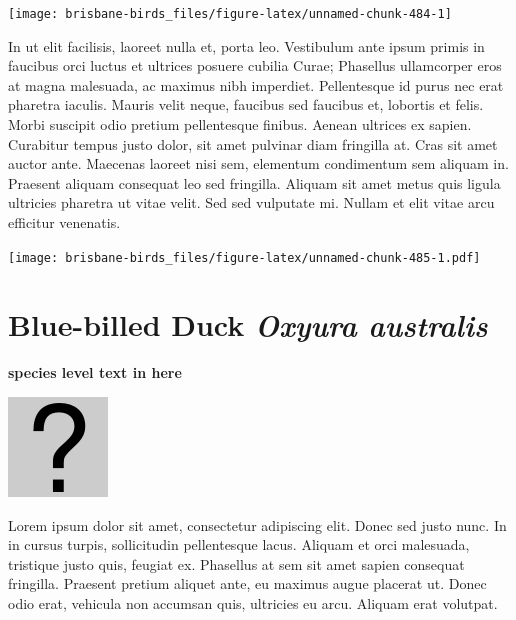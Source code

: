 \documentclass[]{book}
\let\origfigure\figure
\let\endorigfigure\endfigure
\renewenvironment{figure}[1][2] {
  \expandafter\origfigure\expandafter[H]
} {
  \endorigfigure
}
\begin{document}
\begin{figure}
\texttt{[image: brisbane-birds\_files/figure-latex/unnamed-chunk-484-1]} \caption{insert figure caption}\label{fig:unnamed-chunk-484}
\end{figure}

In ut elit facilisis, laoreet nulla et, porta leo. Vestibulum ante ipsum
primis in faucibus orci luctus et ultrices posuere cubilia Curae;
Phasellus ullamcorper eros at magna malesuada, ac maximus nibh
imperdiet. Pellentesque id purus nec erat pharetra iaculis. Mauris velit
neque, faucibus sed faucibus et, lobortis et felis. Morbi suscipit odio
pretium pellentesque finibus. Aenean ultrices ex sapien. Curabitur
tempus justo dolor, sit amet pulvinar diam fringilla at. Cras sit amet
auctor ante. Maecenas laoreet nisi sem, elementum condimentum sem
aliquam in. Praesent aliquam consequat leo sed fringilla. Aliquam sit
amet metus quis ligula ultricies pharetra ut vitae velit. Sed sed
vulputate mi. Nullam et elit vitae arcu efficitur venenatis.

\begin{figure}
\centering
\texttt{[image: brisbane-birds\_files/figure-latex/unnamed-chunk-485-1.pdf]}
\caption{\label{fig:unnamed-chunk-485}insert figure caption}
\end{figure}

\section{\texorpdfstring{Blue-billed Duck \emph{Oxyura
australis}}{Blue-billed Duck Oxyura australis}}\label{blue-billed-duck-oxyura-australis}

\textbf{species level text in here}

\begin{figure}
\centering
\includegraphics{assets/missing.png}
\caption{No image for species}
\end{figure}

Lorem ipsum dolor sit amet, consectetur adipiscing elit. Donec sed justo
nunc. In in cursus turpis, sollicitudin pellentesque lacus. Aliquam et
orci malesuada, tristique justo quis, feugiat ex. Phasellus at sem sit
amet sapien consequat fringilla. Praesent pretium aliquet ante, eu
maximus augue placerat ut. Donec odio erat, vehicula non accumsan quis,
ultricies eu arcu. Aliquam erat volutpat.
\end{document}
